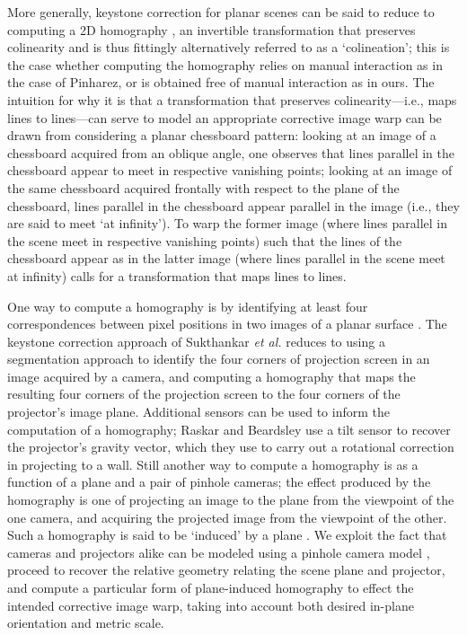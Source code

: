 \documentclass[review]{elsarticle}
\begin{document}
More generally, keystone correction for planar scenes can be said to reduce to computing a 2D homography \cite{Hartley2004}, an invertible transformation that preserves colinearity and is thus fittingly alternatively referred to as a `colineation'; this is the case whether computing the homography relies on manual interaction as in the case of Pinharez, or is obtained free of manual interaction as in ours. The intuition for why it is that a transformation that preserves colinearity---i.e., maps lines to lines---can serve to model an appropriate corrective image warp can be drawn from considering a planar chessboard pattern: looking at an image of a chessboard acquired from an oblique angle, one observes that lines parallel in the chessboard appear to meet in respective vanishing points; looking at an image of the same chessboard acquired frontally with respect to the plane of the chessboard, lines parallel in the chessboard appear parallel in the image (i.e., they are said to meet `at infinity'). To warp the former image (where lines parallel in the scene meet in respective vanishing points) such that the lines of the chessboard appear as in the latter image (where lines parallel in the scene meet at infinity) calls for a transformation that maps lines to lines.

One way to compute a homography is by identifying at least four correspondences between pixel positions in two images of a planar surface \cite{Hartley2004}. The keystone correction approach of Sukthankar \textit{et al.} \cite{sukthankar2001smarter} reduces to using a segmentation approach to identify the four corners of projection screen in an image acquired by a camera, and computing a homography that maps the resulting four corners of the projection screen to the four corners of the projector's image plane. Additional sensors can be used to inform the computation of a homography; Raskar and Beardsley \cite{raskar2001self} use a tilt sensor to recover the projector's gravity vector, which they use to carry out a rotational correction in projecting to a wall. Still another way to compute a homography is as a function of a plane and a pair of pinhole cameras; the effect produced by the homography is one of projecting an image to the plane from the viewpoint of the one camera, and acquiring the projected image from the viewpoint of the other. Such a homography is said to be `induced' by a plane \cite{Hartley2004}. We exploit the fact that cameras and projectors alike can be modeled using a pinhole camera model \cite{bimber2019spatial}, proceed to recover the relative geometry relating the scene plane and projector, and compute a particular form of plane-induced homography to effect the intended corrective image warp, taking into account both desired in-plane orientation and metric scale.
\end{document}
